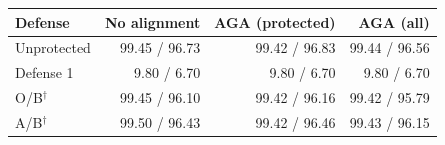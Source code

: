 \begin{tabular}{lrrr}
\toprule
Defense & No alignment & AGA (protected) & AGA (all) \\
\midrule
Unprotected & 99.45 / 96.73 & 99.42 / 96.83 & 99.44 / 96.56 \\
Defense 1 & 9.80 / 6.70 & 9.80 / 6.70 & 9.80 / 6.70 \\
O/B$^{\dagger}$ & 99.45 / 96.10 & 99.42 / 96.16 & 99.42 / 95.79 \\
A/B$^{\dagger}$ & 99.50 / 96.43 & 99.42 / 96.46 & 99.43 / 96.15 \\
\bottomrule
\end{tabular}
